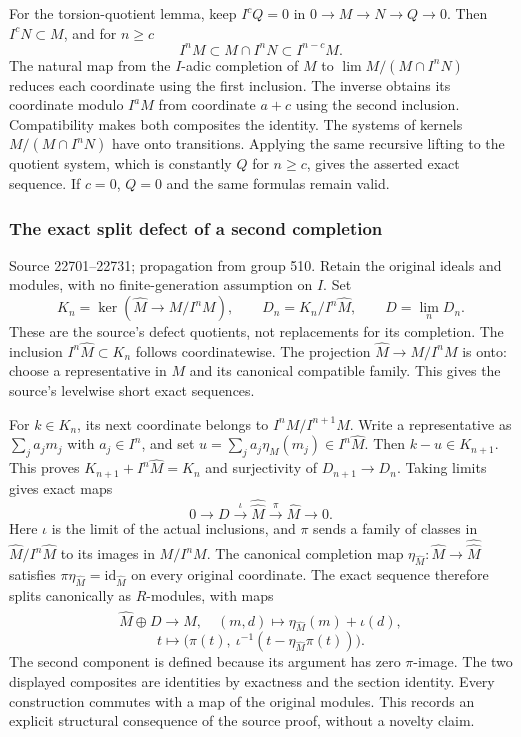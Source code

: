 For the torsion-quotient lemma, keep \(I^cQ=0\) in \(0\to M\to N\to Q\to0\). Then \(I^cN\subset M\), and for \(n\geq c\) \[
I^nM\subset M\cap I^nN\subset I^{n-c}M.
\] The natural map from the \(I\)-adic completion of \(M\) to \(\lim M/(M\cap I^nN)\) reduces each coordinate using the first inclusion. The inverse obtains its coordinate modulo \(I^aM\) from coordinate \(a+c\) using the second inclusion. Compatibility makes both composites the identity. The systems of kernels \(M/(M\cap I^nN)\) have onto transitions. Applying the same recursive lifting to the quotient system, which is constantly \(Q\) for \(n\geq c\), gives the asserted exact sequence. If \(c=0\), \(Q=0\) and the same formulas remain valid.

\subsubsection{The exact split defect of a second completion}\label{the-exact-split-defect-of-a-second-completion}

Source 22701--22731; propagation from group 510. Retain the original ideals and modules, with no finite-generation assumption on \(I\). Set \[
K_n=\ker(\widehat M\to M/I^nM),\qquad
D_n=K_n/I^n\widehat M,\qquad D=\lim_nD_n .
\] These are the source's defect quotients, not replacements for its completion. The inclusion \(I^n\widehat M\subset K_n\) follows coordinatewise. The projection \(\widehat M\to M/I^nM\) is onto: choose a representative in \(M\) and its canonical compatible family. This gives the source's levelwise short exact sequences.

For \(k\in K_n\), its next coordinate belongs to \(I^nM/I^{n+1}M\). Write a representative as \(\sum_j a_jm_j\) with \(a_j\in I^n\), and set \(u=\sum_j a_j\eta_M(m_j)\in I^n\widehat M\). Then \(k-u\in K_{n+1}\). This proves \(K_{n+1}+I^n\widehat M=K_n\) and surjectivity of \(D_{n+1}\to D_n\). Taking limits gives exact maps \[
0\longrightarrow D\xrightarrow{\iota}
  \widehat{\widehat M}\xrightarrow{\pi}\widehat M
  \longrightarrow0.
\] Here \(\iota\) is the limit of the actual inclusions, and \(\pi\) sends a family of classes in \(\widehat M/I^n\widehat M\) to its images in \(M/I^nM\). The canonical completion map \(\eta_{\widehat M}:\widehat M\to\widehat{\widehat M}\) satisfies \(\pi\eta_{\widehat M}=\mathrm{id}_{\widehat M}\) on every original coordinate. The exact sequence therefore splits canonically as \(R\)-modules, with maps \[
\widehat M\oplus D\longrightarrow\widehat{\widehat M},
\quad (m,d)\longmapsto\eta_{\widehat M}(m)+\iota(d),
\] \[
t\longmapsto
 \bigl(\pi(t),\ \iota^{-1}(t-\eta_{\widehat M}\pi(t))\bigr).
\] The second component is defined because its argument has zero \(\pi\)-image. The two displayed composites are identities by exactness and the section identity. Every construction commutes with a map of the original modules. This records an explicit structural consequence of the source proof, without a novelty claim.

